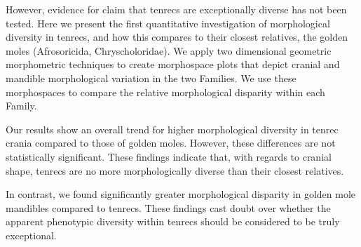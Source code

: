 \documentclass[12pt,a4paper]{article}
\begin{document}
	However, evidence for claim that tenrecs are exceptionally diverse has not been tested. Here we present the first quantitative investigation of morphological diversity in tenrecs, and how this compares to their closest relatives, the golden moles (Afrosoricida, Chryscholoridae). 
	We apply two dimensional geometric morphometric techniques \citep{Rohlf1993, Adams2013} to create morphospace plots that depict cranial and mandible morphological variation in the two Families. We use these morphospaces to compare the relative morphological disparity \citep{Foote1997, Wills1994, Erwin2007} within each Family. 
	




	Our results show an overall trend for higher morphological diversity in tenrec crania compared to those of golden moles. However, these differences are not statistically significant. These findings indicate that, with regards to cranial shape, tenrecs are no more morphologically diverse than their closest relatives. 
	
	
	In contrast, we found significantly greater morphological disparity in golden mole mandibles compared to tenrecs. 
	These findings cast doubt over whether the apparent phenotypic diversity within tenrecs should be considered to be truly exceptional. 
\end{document}
